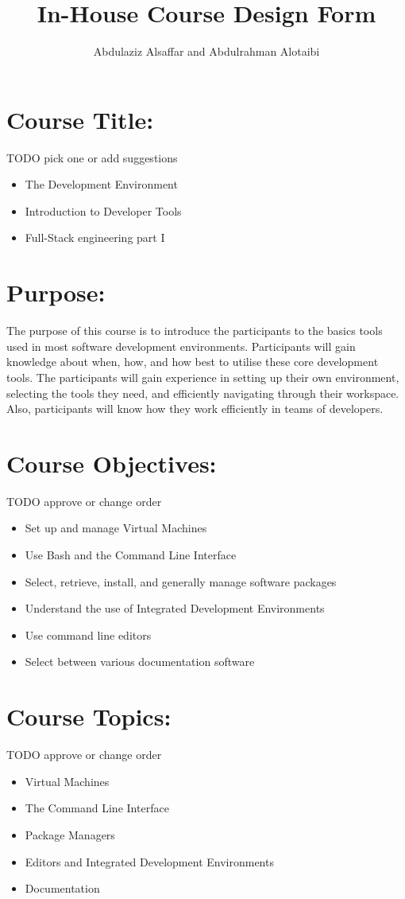 \documentclass[a4paper,11pt]{article}
\author{Abdulaziz Alsa{f}far and Abdulrahman Alotaibi}
\title{In-House Course Design Form}
\begin{document}
\maketitle
\pagestyle{plain}
\setcounter{page}{1}

\section{Course Title:}
TODO pick one or add suggestions
\begin{itemize}
    \item The Development Environment
    \item Introduction to Developer Tools
    \item Full-Stack engineering part I
\end{itemize}

\section{Purpose:}
The purpose of this course is to introduce the participants to the basics tools used in most software development environments.
Participants will gain knowledge about when, how, and how best to utilise these core development tools. 
The participants will gain experience in setting up their own environment, selecting the tools they need, and e{f}ficiently navigating through their workspace. Also, participants will know how they work ef{}ficiently in teams of developers.

\section{Course Objectives:}
TODO approve or change order
\begin{itemize}
	\item Set up and manage Virtual Machines
	\item Use Bash and the Command Line Interface
	\item Select, retrieve, install, and generally manage software packages
	\item Understand the use of Integrated Development Environments
	\item Use command line editors
	\item Select between various documentation software
\end{itemize}

\section{Course Topics:}
TODO approve or change order
\begin{itemize}
	\item Virtual Machines
	\item The Command Line Interface
	\item Package Managers
	\item Editors and Integrated Development Environments
	\item Documentation
\end{itemize}
\end{document}
